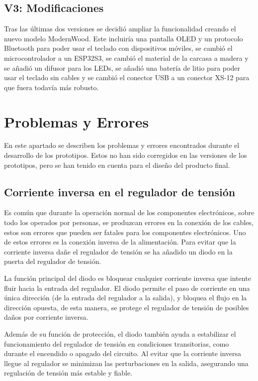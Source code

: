 \subsection{V3: Modificaciones}
Tras las últimas dos versiones se decidió ampliar la funcionalidad creando el nuevo modelo ModernWood. Este incluiría una pantalla \gls{OLED} y un protocolo \gls{Bluetooth} para poder usar el teclado con dispositivos móviles, se cambió el microcontrolador a un ESP32S3, se cambió el material de la carcasa a madera y se añadió un difusor para los \gls{LED}s, se añadió una batería de litio para poder usar el teclado sin cables y se cambió el conector \gls{USB} a un conector XS-12 para que fuera todavía más robusto.

\section{Problemas y Errores} \label{Errores}
En este apartado se describen los problemas y errores encontrados durante el desarrollo de los prototipos. Estos no han sido corregidos en las versiones de los prototipos, pero se han tenido en cuenta para el diseño del producto final.
\subsection{Corriente inversa en el regulador de tensión} \label{CorrienteInversa}
Es común que durante la operación normal de los componentes electrónicos, sobre todo los operados por personas, se produzcan errores en la conexión de los cables, estos son errores que pueden ser fatales para los componentes electrónicos. Uno de estos errores es la conexión inversa de la alimentación. Para evitar que la corriente inversa dañe el regulador de tensión se ha añadido un diodo en la puerta del regulador de tensión.

La función principal del diodo es bloquear cualquier corriente inversa que intente fluir hacia la entrada del regulador. El diodo permite el paso de corriente en una única dirección (de la entrada del regulador a la salida), y bloquea el flujo en la dirección opuesta, de esta manera, se protege el regulador de tensión de posibles daños por corriente inversa.

Además de su función de protección, el diodo también ayuda a estabilizar el funcionamiento del regulador de tensión en condiciones transitorias, como durante el encendido o apagado del circuito. Al evitar que la corriente inversa llegue al regulador se minimizan las perturbaciones en la salida, asegurando una regulación de tensión más estable y fiable.

